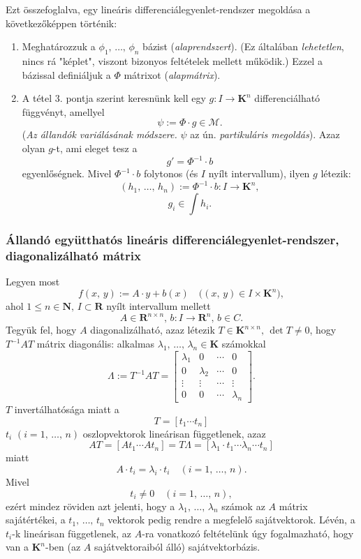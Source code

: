 \documentclass{article}
\newcommand{\R}{\mathbf{R}}
\newcommand{\N}{\mathbf{N}}
\newcommand{\K}{\mathbf{K}}
\begin{document}
	Ezt összefoglalva, egy lineáris differenciálegyenlet-rendszer megoldása a következőképpen történik:
	\begin{enumerate}
		\item Meghatározzuk a $\phi_1, \, \dots, \, \phi_n$ bázist (\textit{alaprendszert}). (Ez általában \textit{lehetetlen}, nincs rá "képlet", viszont bizonyos feltételek mellett működik.) Ezzel a bázissal definiáljuk a $\Phi$ mátrixot (\textit{alapmátrix}).
		\item A tétel 3. pontja szerint keresnünk kell egy $g : I \to \K^n$ differenciálható függvényt, amellyel
		\[
			\psi := \Phi \cdot g \in \mathcal{M}.
		\]
		(\textit{Az állandók variálásának módszere.} $\psi$ az ún. \textit{partikuláris megoldás}). Azaz olyan $g$-t, ami eleget tesz a
		\[
			g' = \Phi^{-1} \cdot b
		\]
		egyenlőségnek. Mivel $\Phi^{-1} \cdot b$ folytonos (és $I$ nyílt intervallum), ilyen $g$ létezik:
		\[	
			(h_1, \, \dots, \, h_n) := \Phi^{-1} \cdot b : I \to \K^n,
		\]
		\[
			g_i \in \int h_i.
		\]	
	\end{enumerate}
	
	\subsubsection{Állandó együtthatós lineáris differenciálegyenlet-rendszer, diagonalizálható mátrix}
	Legyen most
	\[
		f(x, \, y) := A \cdot y + b(x) \quad \big( (x, \, y) \in I \times \K^n \big),
	\]
	ahol $1 \leq n \in \N, \, I \subset \R$ nyílt intervallum mellett
	\[
		A \in \R^{n \times n}, \, b : I \to \R^n, \, b \in C.
	\]
	Tegyük fel, hogy $A$ diagonalizálható, azaz létezik $T \in \K^{n \times n}, \, \det T \neq 0$, hogy $T^{-1}AT$ mátrix diagonális: alkalmas $\lambda_1, \, \dots, \, \lambda_n \in \K$ számokkal
	\[
		\Lambda := T^{-1}AT = \begin{bmatrix}
			\lambda_1 & 0 & \cdots & 0 \\
			0 & \lambda_2 & \cdots & 0 \\
			\vdots & \vdots & \cdots & \vdots \\
			0 & 0 & \cdots & \lambda_n
		\end{bmatrix}.
	\]
	$T$ invertálhatósága miatt a
	\[
		 T = [t_1 \cdots t_n]
	\]
	$t_i$ $(i=1, \, \dots, \, n)$ oszlopvektorok lineárisan függetlenek, azaz
	\[
		AT = [At_1 \cdots At_n] = T\Lambda = [\lambda_1 \cdot t_1 \cdots \lambda_n \cdots t_n]
	\]
	miatt
	\[
		A \cdot t_i = \lambda_i \cdot t_i \quad (i = 1, \, \dots, \, n).
	\]
	Mivel
	\[
		t_i \neq 0 \quad (i = 1, \, \dots, \, n),
	\]
	ezért mindez röviden azt jelenti, hogy a $\lambda_1, \, \dots, \, \lambda_n$ számok az $A$ mátrix sajátértékei, a $t_1, \, \dots, \, t_n$ vektorok pedig rendre a megfelelő sajátvektorok. Lévén, a $t_i$-k lineárisan függetlenek, az $A$-ra vonatkozó feltételünk úgy fogalmazható, hogy van a $\K^n$-ben (az $A$ sajátvektoraiból álló) sajátvektorbázis.\\
	
\end{document}

